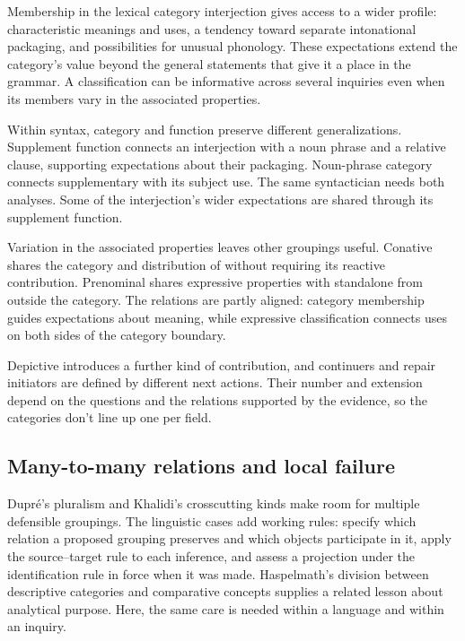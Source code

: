 \documentclass[12pt]{article}
\begin{document}
Membership in the lexical category interjection gives access to a wider
profile: characteristic meanings and uses, a tendency toward separate
intonational packaging, and possibilities for unusual phonology. These
expectations extend the category's value beyond the general statements
that give it a place in the grammar. A classification can be informative across several inquiries
even when its members vary in the associated properties.

Within syntax, category and function preserve different generalizations.
Supplement function connects an interjection with a noun phrase and
a relative clause, supporting expectations about their packaging. Noun-phrase
category connects supplementary  with its subject
use. The same syntactician needs both analyses. Some of the interjection's
wider expectations are shared through its supplement function.

Variation in the associated properties leaves other groupings useful.
Conative  shares the category and distribution of 
without requiring its reactive contribution. Prenominal 
shares expressive properties with standalone  from outside
the category. The relations are partly aligned: category membership guides
expectations about meaning, while expressive classification connects uses
on both sides of the category boundary.

Depictive  introduces a further kind of contribution, and
continuers and repair initiators are defined by different next actions. Their number
and extension depend on the questions and the relations supported by the
evidence, so the categories don't line up one per field.

\subsection{Many-to-many relations and local failure}

Dupr\'e's pluralism and Khalidi's crosscutting kinds make room for
multiple defensible groupings. The linguistic cases add working rules:
specify which relation a proposed grouping preserves and which objects
participate in it, apply the source--target rule to each inference, and
assess a projection under the identification rule in force when it was
made. Haspelmath's division between descriptive
categories and comparative concepts supplies a related lesson about
analytical purpose. Here, the same care is needed within a language
and within an inquiry.
\end{document}
